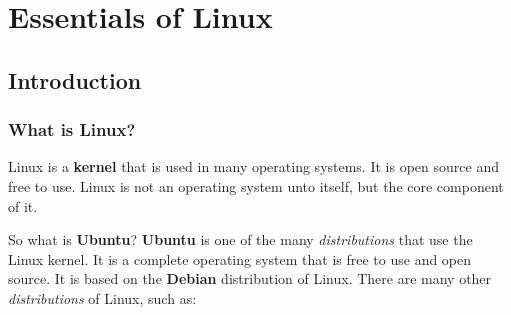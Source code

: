 \chapter{Essentials of Linux}

\section{Introduction}

\subsection{What is Linux?}

\begin{definition}[Linux]
  Linux is a \textbf{kernel} that is used in many operating systems. It is open source and free to use. Linux is not an operating system unto itself, but the core component of it.
\end{definition}

So what is \textbf{Ubuntu}? \textbf{Ubuntu} is one of the many \textit{distributions} that use the Linux kernel. It is a complete operating system that is free to use and open source. It is based on the \textbf{Debian} distribution of Linux. There are many other \textit{distributions} of Linux, such as:

